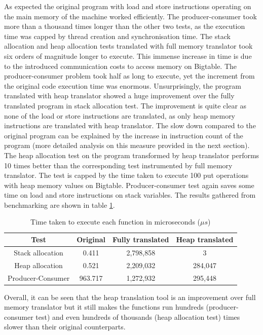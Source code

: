 \documentclass[bsc,frontabs,twoside,singlespacing,parskip,deptreport]{infthesis}     %
\begin{document}
As expected the original program with load and store instructions operating on the main memory of the machine worked efficiently. The producer-consumer took more than a thousand times longer than the other two tests, as the execution time was capped by thread creation and synchronisation time. The stack allocation and heap allocation tests translated with full memory translator took six orders of magnitude longer to execute. This immense increase in time is due to the introduced communication costs to access memory on Bigtable. The producer-consumer problem took half as long to execute, yet the increment from the original code execution time was enormous. Unsurprisingly, the program translated with heap translator showed a huge improvement over the fully translated program in stack allocation test. The improvement is quite clear as none of the load or store instructions are translated, as only heap memory instructions are translated with heap translator. The slow down compared to the original program can be explained by the increase in instruction count of the program (more detailed analysis on this measure provided in the next section). The heap allocation test on the program transformed by heap translator performs 10 times better than the corresponding test instrumented by full memory translator. The test is capped by the time taken to execute 100 put operations with heap memory values on Bigtable. Producer-consumer test again saves some time on load and store instructions on stack variables. The results gathered from benchmarking are shown in table \ref{table:performance}.

\begin{table}[h]
\centering
\begin{tabular}{ c | c c c }
Test & Original & Fully translated & Heap translated \\
\hline
Stack allocation & 0.411 & 2,798,858 & 3 \\
Heap allocation & 0.521 & 2,209,032 & 284,047 \\
Producer-Consumer & 963.717 & 1,272,932 & 295,448
\end{tabular}
\caption{Time taken to execute each function in microseconds ($\mu s$)}
\label{table:performance}
\end{table}

Overall, it can be seen that the heap translation tool is an improvement over full memory translator but it still makes the functions run hundreds (producer-consumer test) and even hundreds of thousands (heap allocation test) times slower than their original counterparts.
\end{document}
